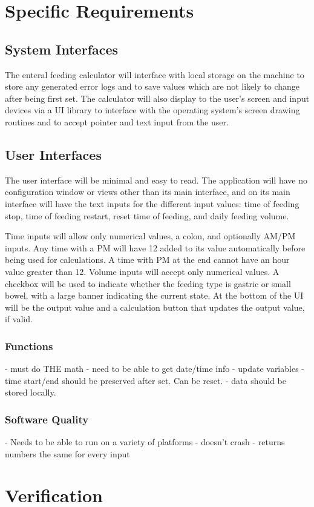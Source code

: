 \documentclass[10pt,draftclsnofoot,onecolumn]{IEEEtran}
\begin{document}
\section{Specific Requirements}
\subsection{System Interfaces}
The enteral feeding calculator will interface with local storage on the machine to store any generated 
error logs and to save values which are not likely to change after being first set. The calculator will
also display to the user's screen and input devices via a UI library to interface with the operating system's screen drawing
routines and to accept pointer and text input from the user.

\subsection{User Interfaces}
The user interface will be minimal and easy to read. The application will have no configuration window
or views other than its main interface, and on its main interface will have the text inputs for the different
input values: time of feeding stop, time of feeding restart, reset time of feeding, and daily feeding volume.

Time inputs will allow only numerical values, a colon, and optionally AM/PM inputs. Any time with a PM will
have 12 added to its value automatically before being used for calculations. A time with PM at the end cannot have an hour value greater than 12.
Volume inputs will accept only numerical values. A checkbox will be used to indicate whether the feeding type is gastric or
small bowel, with a large banner indicating the current state. At the bottom of the UI will be the output value and a calculation
button that updates the output value, if valid.

\subsubsection{Functions}
- must do THE math
- need to be able to get date/time info
- update variables
- time start/end should be preserved after set. Can be reset.
- data should be stored locally.

\subsubsection{Software Quality}
- Needs to be able to run on a variety of platforms
- doesn't crash
- returns numbers the same for every input

\section{Verification}
\end{document}

